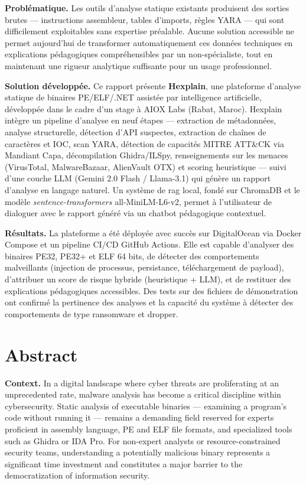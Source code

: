 \textbf{Problématique.} Les outils d'analyse statique existants produisent des sorties brutes --- instructions assembleur, tables d'imports, règles YARA --- qui sont difficilement exploitables sans expertise préalable. Aucune solution accessible ne permet aujourd'hui de transformer automatiquement ces données techniques en explications pédagogiques compréhensibles par un non-spécialiste, tout en maintenant une rigueur analytique suffisante pour un usage professionnel.

\textbf{Solution développée.} Ce rapport présente \textbf{Hexplain}, une plateforme d'analyse statique de binaires PE/ELF/.NET assistée par intelligence artificielle, développée dans le cadre d'un stage à AIOX Labs (Rabat, Maroc). Hexplain intègre un pipeline d'analyse en neuf étapes --- extraction de métadonnées, analyse structurelle, détection d'API suspectes, extraction de chaînes de caractères et IOC, scan YARA, détection de capacités MITRE ATT\&CK via Mandiant Capa, décompilation Ghidra/ILSpy, renseignements sur les menaces (VirusTotal, MalwareBazaar, AlienVault OTX) et scoring heuristique --- suivi d'une couche LLM (Gemini 2.0 Flash / Llama-3.1) qui génère un rapport d'analyse en langage naturel. Un système de \acrfull{rag} local, fondé sur ChromaDB et le modèle \textit{sentence-transformers} all-MiniLM-L6-v2, permet à l'utilisateur de dialoguer avec le rapport généré via un chatbot pédagogique contextuel.

\textbf{Résultats.} La plateforme a été déployée avec succès sur DigitalOcean via Docker Compose et un pipeline CI/CD GitHub Actions. Elle est capable d'analyser des binaires PE32, PE32+ et ELF 64 bits, de détecter des comportements malveillants (injection de processus, persistance, téléchargement de payload), d'attribuer un score de risque hybride (heuristique + LLM), et de restituer des explications pédagogiques accessibles. Des tests sur des fichiers de démonstration ont confirmé la pertinence des analyses et la capacité du système à détecter des comportements de type ransomware et dropper.


\clearpage
\chapter*{Abstract}

\textbf{Context.} In a digital landscape where cyber threats are proliferating at an unprecedented rate, malware analysis has become a critical discipline within cybersecurity. Static analysis of executable binaries --- examining a program's code without running it --- remains a demanding field reserved for experts proficient in assembly language, PE and ELF file formats, and specialized tools such as Ghidra or IDA Pro. For non-expert analysts or resource-constrained security teams, understanding a potentially malicious binary represents a significant time investment and constitutes a major barrier to the democratization of information security.

